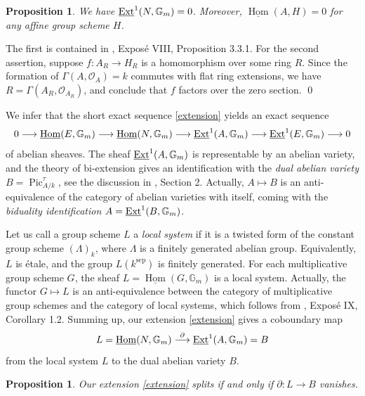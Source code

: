 \documentclass[oneside, 12pt]{amsart}
\newcommand\mylabel[1]{\label{#1}\marginpar{\raggedright\vspace{-1ex}\medskip\medskip\footnotesize \tt #1}}
\renewcommand\mylabel[1]{\label{#1}}
\newtheorem{proposition}[theorem]{Proposition}
\theoremstyle{definition}
\theoremstyle{remark}
\newcommand{\GG}{\mathbb{G}}
\newcommand{\lra}{\longrightarrow}
\renewcommand{\O}{\mathscr{O}}
\newcommand{\Pic}{\operatorname{Pic}}
\newcommand{\ra}{\rightarrow}
\newcommand{\sep}{{\operatorname{sep}}}
\newcommand{\uHom}{\underline{\operatorname{Hom}}}
\begin{document}
\begin{proposition} 
\mylabel{zero sheaves}
We have $\uExt^1(N,\GG_m)=0$.  
Moreover,  $\uHom(A,H)=0$ for any affine group scheme $H$. 
\end{proposition}

\proof 
The first is contained in \cite{SGA 7a}, Expos\'e VIII, Proposition 3.3.1. 
For the second assertion, suppose  $f:A_R\ra H_R$ is a homomorphism over some ring $R$.
Since the formation of $\Gamma(A,\O_A)=k$ commutes with flat ring extensions, we have $R=\Gamma(A_R,\O_{A_R})$,
and conclude that $f$ factors over the zero section.
\qed
 
\medskip 
We infer that the short exact sequence \eqref{extension} yields an exact sequence
$$
0\lra \uHom(E,\GG_m)\lra \uHom(N,\GG_m)\lra \uExt^1(A,\GG_m)\lra \uExt^1(E,\GG_m)\lra 0
$$
of abelian sheaves. The sheaf $\uExt^1(A,\GG_m)$ is representable by an abelian variety,
and the theory of bi-extension gives an identification with the \emph{dual abelian variety} $B=\Pic^\tau_{A/k}$,
see the discussion in \cite{Roessler; Schroeer 2020}, Section  2. Actually, $A\mapsto B$ is an anti-equivalence of
the category of abelian varieties with itself, coming with the \emph{biduality identification} $A=\uExt^1(B,\GG_m)$.

Let us call a group scheme $L$ a \emph{local system} if it is a twisted form of the constant group scheme
$(\Lambda)_k$, where $\Lambda$ is a finitely generated abelian group.
Equivalently, $L$ is \'etale, and the group $L(k^\sep)$ is finitely generated.
For each multiplicative group scheme $G$, the sheaf $L=\uHom(G,\GG_m)$ is a local system.
Actually, the functor $G\mapsto L$ is an anti-equivalence between the   category of multiplicative group schemes  
and the category of local systems, which follows from \cite{SGA 3b}, Expos\'e IX, Corollary 1.2.
Summing up, our extension \eqref{extension} gives a coboundary map
$$
L=\uHom(N,\GG_m)\stackrel{\partial}{\lra} \uExt^1(A,\GG_m)=B
$$
from the local system $L$ to the dual abelian variety $B$.
 
\begin{proposition}
\mylabel{coboundary}
Our  extension \eqref{extension} splits if and only if   $\partial:L\ra B$ vanishes.
\end{proposition}
\end{document}
